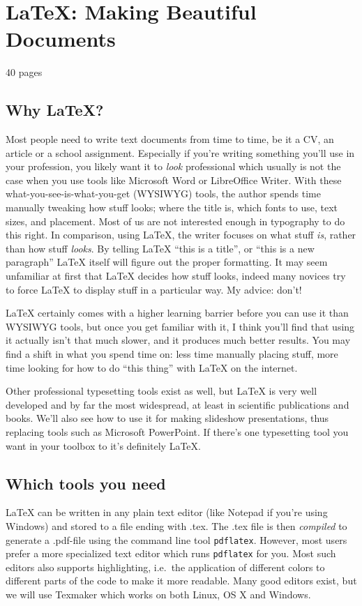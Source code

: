 \chapter{\LaTeX: Making Beautiful Documents}\label{ch:latex}
40 pages

\section{Why \LaTeX?}
Most people need to write text documents from time to time, be it a CV, an article or a school assignment. Especially if you're writing something you'll use in your profession, you likely want it to \emph{look} professional which usually is not the case when you use tools like Microsoft Word or LibreOffice Writer. With these what-you-see-is-what-you-get (WYSIWYG) tools, the author spends time manually tweaking how stuff looks; where the title is, which fonts to use, text sizes, and placement. Most of us are not interested enough in typography to do this right. In comparison, using \LaTeX{}, the writer focuses on what stuff \emph{is}, rather than how stuff \emph{looks}. By telling \LaTeX{} ``this is a title'', or ``this is a new paragraph'' \LaTeX{} itself will figure out the proper formatting. It may seem unfamiliar at first that \LaTeX{} decides how stuff looks, indeed many novices try to force \LaTeX{} to display stuff in a particular way. My advice: don't!

\LaTeX{} certainly comes with a higher learning barrier before you can use it than WYSIWYG tools, but once you get familiar with it, I think you'll find that using it actually isn't that much slower, and it produces much better results. You may find a shift in what you spend time on: less time manually placing stuff, more time looking for how to do ``this thing'' with \LaTeX{} on the internet.

Other professional typesetting tools exist as well, but \LaTeX{} is very well developed and by far the most widespread, at least in scientific publications and books. We'll also see how to use it for making slideshow presentations, thus replacing tools such as Microsoft PowerPoint. If there's one typesetting tool you want in your toolbox to it's definitely \LaTeX{}.

\section{Which tools you need}
\LaTeX{} can be written in any plain text editor (like Notepad if you're using Windows) and stored to a file ending with .tex. The .tex file is then \emph{compiled} to generate a .pdf-file using the command line tool \verb|pdflatex|. However, most users prefer a more specialized text editor which runs \verb|pdflatex| for you. Most such editors also supports highlighting, i.e.\ the application of different colors to different parts of the code to make it more readable. Many good editors exist, but we will use Texmaker which works on both Linux, OS X and Windows.

